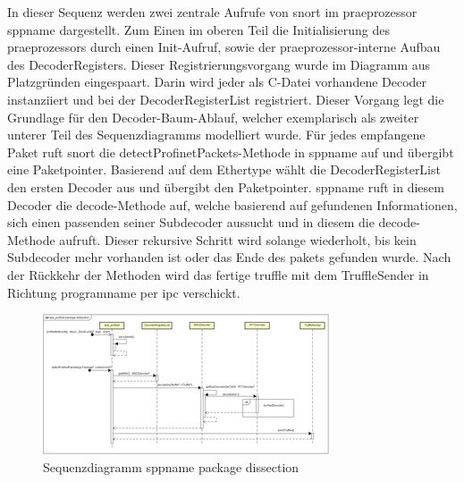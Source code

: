 
In dieser Sequenz werden zwei zentrale Aufrufe von \gls{snort} im \gls{praeprozessor} \gls{sppname} dargestellt. Zum Einen im oberen Teil die Initialisierung des \gls{praeprozessor}s durch einen Init-Aufruf, sowie der \gls{praeprozessor}-interne Aufbau des DecoderRegisters. Dieser Registrierungsvorgang wurde im Diagramm aus Platzgründen eingespaart. Darin wird jeder als C-Datei vorhandene Decoder instanziiert und bei der DecoderRegisterList registriert. Dieser Vorgang legt die Grundlage für den Decoder-Baum-Ablauf, welcher exemplarisch als zweiter unterer Teil des Sequenzdiagramms modelliert wurde. Für jedes empfangene Paket ruft \gls{snort} die detectProfinetPackets-Methode in \gls{sppname} auf und übergibt eine Paketpointer. Basierend auf dem Ethertype wählt die DecoderRegisterList den ersten Decoder aus und übergibt den Paketpointer. \gls{sppname} ruft in diesem Decoder die decode-Methode auf, welche basierend auf gefundenen Informationen, sich einen passenden seiner Subdecoder aussucht und in diesem die decode-Methode aufruft. Dieser rekursive Schritt wird solange wiederholt, bis kein Subdecoder mehr vorhanden ist oder das Ende des \gls{paket}s gefunden wurde.
Nach der Rückkehr der Methoden wird das fertige \gls{truffle} mit dem TruffleSender in Richtung \gls{programname} per \gls{ipc} verschickt.

\begin{figure}[H]
  \centering
  \includegraphics[width=\textwidth]{../diagramimages/spp-profinet-package-dissection.png}
  \caption[Sequenzdiagramm \gls{sppname} package dissection]{Sequenzdiagramm \gls{sppname} package dissection}
\end{figure}